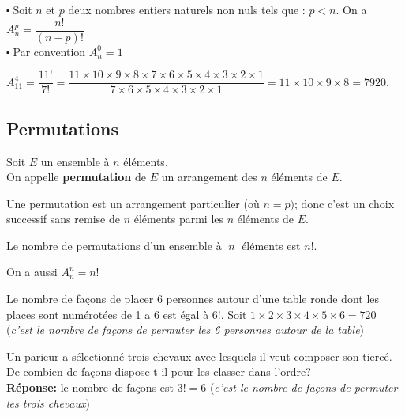 \begin{property}
$ \centerdot $ Soit $ n$ et $p $ deux  nombres  entiers naturels  non nuls tels que : $ p< n $. On a  $A_{n}^{p}= \dfrac{n!}{(n-p)!} $ \\
$ \centerdot $ Par convention $ A_{n}^{0}=1 $
\end{property}
\begin{example}

$A_{11}^{4}= \dfrac{11!}{7!}=\dfrac{11\times10\times9\times 8\times7\times6\times5\times4\times3\times2\times1}{7\times6\times5\times4\times3\times2\times1} =11\times 10\times 9 \times 8 =7920.  $
\end{example}
\subsection*{Permutations}
\begin{definition}
Soit $ E $ un ensemble à $ n $ éléments.\\
On appelle \textbf{permutation} de $ E $ un arrangement des $ n $ éléments de $ E. $
\end{definition}
Une permutation est un arrangement particulier (où $ n=p ) $; donc c'est un choix successif sans remise de $ n $ éléments  parmi les $ n $ éléments de $ E. $
\begin{property}
Le nombre de permutations d'un ensemble à $\; n \;$ éléments est $ n!$.
 \end{property}
  
   On a aussi $A_{n}^{n}=n!$


 \begin{example} 

 Le nombre de façons de placer 6 personnes autour d'une table ronde  dont les places sont numérotées de 1 a 6 est égal à $ 6! $. 	Soit $ 1\times 2\times 3\times 4\times 5 \times 6= 720 $\; (\textit{c'est le nombre de façons de permuter les 6  personnes autour de la table})
 \end{example}
 
  \begin{example}

 Un parieur a sélectionné trois chevaux avec lesquels il veut composer son tiercé. De combien de façons  dispose-t-il pour les classer dans l'ordre? \\
 \textbf{Réponse:}  le nombre de façons est $ 3!= 6 $\; (\textit{c'est le nombre de façons de permuter les trois chevaux})
	 \end{example}
